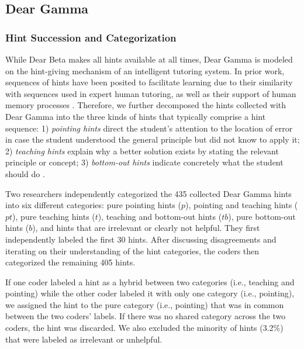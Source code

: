 \documentclass[12pt,twoside]{mitthesis}
\providecommand{\DIFaddbegin}{} %
\providecommand{\DIFaddend}{} %
\providecommand{\DIFdelbegin}{} %
\providecommand{\DIFdelend}{} %
\begin{document}
{{{{{{{{{{\DIFdelbegin %
\DIFdelend \DIFaddbegin \subsection{Dear Gamma}
\DIFaddend 

\subsubsection{Hint Succession and Categorization}
\DIFaddbegin 

\DIFaddend While Dear Beta makes all hints available at all times, Dear Gamma is modeled on the hint-giving mechanism of an intelligent tutoring system. In prior work, sequences of hints have been posited to facilitate learning due to their similarity with sequences used in expert human tutoring, as well as their support of human memory processes \cite{sottilare2014design}. Therefore, we further decomposed the hints collected with Dear Gamma into the three kinds of hints that typically comprise a hint sequence: 1) \textit{pointing hints} direct the student's attention to the location of error in case the student understood the general principle but did not know to apply it; 2) \textit{teaching hints} explain why a better solution exists by stating the relevant principle or concept; 3) \textit{bottom-out hints} indicate concretely what the student should do \cite{andes}. 

Two researchers independently categorized the 435 collected Dear Gamma hints into six different categories: pure pointing hints ($p$), pointing and teaching hints ($pt$), pure teaching hints ($t$), teaching and bottom-out hints ($tb$), pure bottom-out hints ($b$), and hints that are irrelevant or clearly not helpful. They first independently labeled the first 30 hints. After discussing disagreements and iterating on their understanding of the hint categories, the coders then categorized the remaining 405 hints. 

If one coder labeled a hint as a hybrid between two categories (i.e., teaching and pointing) while the other coder labeled it with only one category (i.e., pointing), we assigned the hint to the pure category (i.e., pointing) that was in common between the two coders' labels. If there was no shared category across the two coders, the hint was discarded. We also excluded the minority of hints (3.2\%) that were labeled as irrelevant or unhelpful.

}}}}}}}}}}
\end{document}
